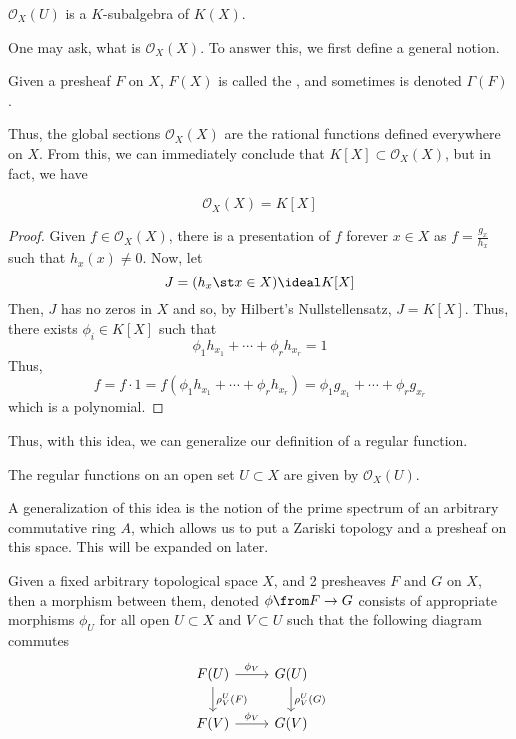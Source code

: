 \documentclass[11pt,leqno,oneside]{amsbook}
\renewcommand{\F}{F}
\newcommand{\G}{G}
\renewcommand{\O}{\mathcal{O}}
\numberwithin{thm}{section}
\begin{document}
\begin{prop}
  \(\O_X(U)\) is a \(K\)-subalgebra of \(K(X)\).
\end{prop}
One may ask, what is \(\O_X(X)\). To answer this, we first define a
general notion.
\begin{defn}
  Given a presheaf \(\F\) on \(X\), \(\F(X)\) is called the , and sometimes is denoted \(\Gamma(\F)\).
\end{defn}
Thus, the global sections \(\O_X(X)\) are the rational functions
defined everywhere on \(X\). From this, we can immediately conclude
that \(K[X] \subset \O_X(X)\), but in fact, we have
\begin{prop}
  \[
    \O_X(X) = K[X]
  \]
\end{prop}
\begin{proof}
  Given \(f \in \O_X(X)\), there is a presentation of \(f\) forever
  \(x \in X\) as \(f = \frac{g_x}{h_x}\) such that \(h_x(x) \neq
  0\). Now, let \[
    J = (h_x \st x \in X) \ideal K[X]
  \]
  Then, \(J\) has no zeros in \(X\) and so, by Hilbert's
  Nullstellensatz, \(J = K[X]\). Thus, there exists \(\phi_i \in
  K[X]\) such that \[
    \phi_1 h_{x_1} + \cdots + \phi_r h_{x_r} = 1
  \]
  Thus, \[
    f = f \cdot 1 = f(\phi_1 h_{x_1} + \cdots + \phi_r h_{x_r}) =
    \phi_1 g_{x_1} + \cdots + \phi_r g_{x_r}
  \]
  which is a polynomial.
\end{proof}
Thus, with this idea, we can generalize our definition of a regular
function.
\begin{defn}
  The regular functions on an open set \(U \subset X\) are given by
  \(\O_X(U)\). 
\end{defn}
\begin{rmk}
  A generalization of this idea is the notion of the prime spectrum of
  an arbitrary commutative ring \(A\), which allows us to put a
  Zariski topology and a presheaf on this space.  This will be
  expanded on later.
\end{rmk}
\begin{defn}
  Given a fixed arbitrary topological space \(X\), and 2 presheaves
  \(\F\) and \(\G\) on \(X\), then a morphism between them, denoted
  \(\phi \from F \to G\) consists of appropriate morphisms \(\phi_U\)
  for all open \(U \subset X\) and \(V \subset U\) such that the
  following diagram 
  commutes \[
    \begin{tikzcd}
      \F(U) \ar[d,"\rho^U_V(\F)"] \ar[r,"\phi_V"] & \G(U)
      \ar[d,"\rho^U_V(\G)"] \\
      \F(V) \ar[r, "\phi_V"] & \G(V)
    \end{tikzcd}
  \]
\end{defn}
\end{document}
